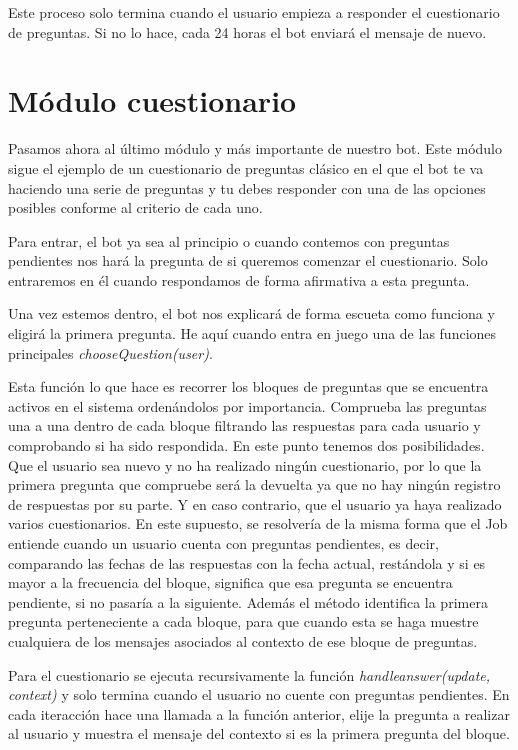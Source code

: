 Este proceso solo termina cuando el usuario empieza a responder el cuestionario de preguntas. Si no lo hace, cada 24 horas el bot enviará el mensaje de nuevo. 

\section{Módulo cuestionario}


Pasamos ahora al último módulo y más importante de nuestro bot. Este módulo sigue el ejemplo de un cuestionario de preguntas clásico en el que el bot te va haciendo una serie de preguntas y tu debes responder con una de las opciones posibles conforme al criterio de cada uno. 

Para entrar, el bot ya sea al principio o cuando contemos con preguntas pendientes nos hará la pregunta de si queremos comenzar el cuestionario. Solo entraremos en él cuando respondamos de forma afirmativa a esta pregunta. 

Una vez estemos dentro, el bot nos explicará de forma escueta como funciona y eligirá la primera pregunta. He aquí cuando entra en juego una de las funciones principales \textit{chooseQuestion(user)}.

Esta función lo que hace es recorrer los bloques de preguntas que se encuentra activos en el sistema ordenándolos por importancia. Comprueba las preguntas una a una dentro de cada bloque filtrando las respuestas para cada usuario y comprobando si ha sido respondida. En este punto tenemos dos posibilidades. Que el usuario sea nuevo y no ha realizado ningún cuestionario, por lo que la primera pregunta que compruebe será la devuelta ya que no hay ningún registro de respuestas por su parte. Y en caso contrario, que el usuario ya haya realizado varios cuestionarios. En este supuesto, se resolvería de la misma forma que el Job entiende cuando un usuario cuenta con preguntas pendientes, es decir, comparando las fechas de las respuestas con la fecha actual, restándola y si es mayor a la frecuencia del bloque, significa que esa pregunta se encuentra pendiente, si no pasaría a la siguiente. Además el método identifica la primera pregunta perteneciente a cada bloque, para que cuando esta se haga muestre cualquiera de los mensajes asociados al contexto de ese bloque de preguntas.

Para el cuestionario se ejecuta recursivamente la función \textit{handleanswer(update, context)} y solo termina cuando el usuario no cuente con preguntas pendientes. En cada iteracción hace una llamada a la función anterior, elije la pregunta a realizar al usuario y muestra el mensaje del contexto si es la primera pregunta del bloque. \vspace{0.3cm}


